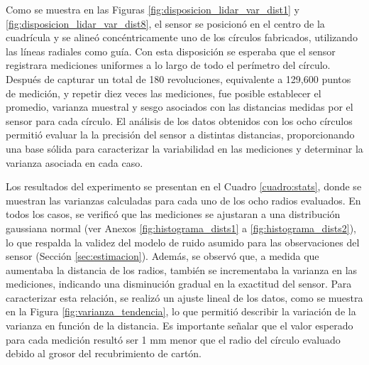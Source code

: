 Como se muestra en las Figuras \ref{fig:disposicion_lidar_var_dist1} y \ref{fig:disposicion_lidar_var_dist8}, el sensor se posicionó en el centro de la cuadrícula y se alineó concéntricamente uno de los círculos fabricados, utilizando las líneas radiales como guía. Con esta disposición se esperaba que el sensor registrara mediciones uniformes a lo largo de todo el perímetro del círculo. Después de capturar un total de 180 revoluciones, equivalente a 129,600 puntos de medición, y repetir diez veces las mediciones, fue posible establecer el promedio, varianza muestral y sesgo asociados con las distancias medidas por el sensor para cada círculo. El análisis de los datos obtenidos con los ocho círculos permitió evaluar la la precisión del sensor a distintas distancias, proporcionando una base sólida para caracterizar la variabilidad en las mediciones y determinar la varianza asociada en cada caso.

Los resultados del experimento se presentan en el Cuadro \ref{cuadro:stats}, donde se muestran las varianzas calculadas para cada uno de los ocho radios evaluados. En todos los casos, se verificó que las mediciones se ajustaran a una distribución gaussiana normal (ver Anexos \ref{fig:histograma_dists1} a \ref{fig:histograma_dists2}), lo que respalda la validez del modelo de ruido asumido para las observaciones del sensor (Sección \ref{sec:estimacion}). Además, se observó que, a medida que aumentaba la distancia de los radios, también se incrementaba la varianza en las mediciones, indicando una disminución gradual en la exactitud del sensor. Para caracterizar esta relación, se realizó un ajuste lineal de los datos, como se muestra en la Figura \ref{fig:varianza_tendencia}, lo que permitió describir la variación de la varianza en función de la distancia. Es importante señalar que el valor esperado para cada medición resultó ser 1 mm menor que el radio del círculo evaluado debido al grosor del recubrimiento de cartón. 

